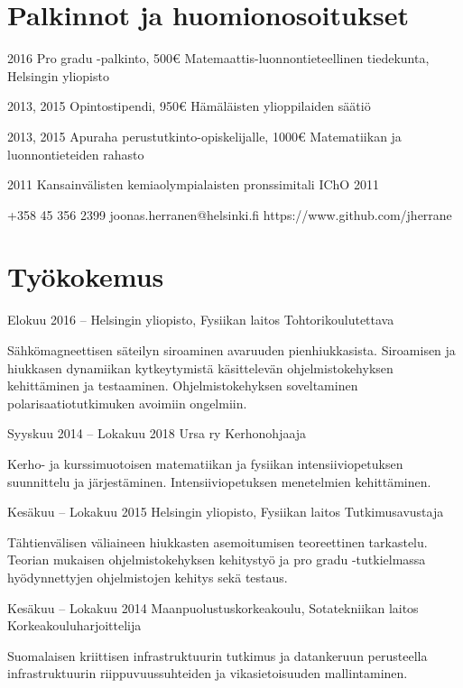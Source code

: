 \documentclass{tccv}
\begin{document}
\section{Palkinnot ja huomionosoitukset}
\begin{yearlist}
	\item{2016}
	{Pro gradu -palkinto, 500€}
	{Matemaattis-luonnontieteellinen tiedekunta, Helsingin yliopisto}
	\item{2013, 2015}
	{Opintostipendi, 950€}
	{Hämäläisten ylioppilaiden säätiö}	
	\item{2013, 2015}
	{Apuraha perustutkinto-opiskelijalle, 1000€}
	{Matematiikan ja luonnontieteiden rahasto}	
	\item{2011}
	{Kansainvälisten kemiaolympialaisten pronssimitali}
	{IChO 2011}	
\end{yearlist}

{+358 45 356 2399}
{joonas.herranen@helsinki.fi}
{https://www.github.com/jherrane}

\section{Työkokemus}
\begin{eventlist}	
	\item{Elokuu 2016 -- }
	{Helsingin yliopisto, Fysiikan laitos}
	{Tohtorikoulutettava}
	
	Sähkömagneettisen säteilyn siroaminen avaruuden pienhiukkasista. Siroamisen ja hiukkasen dynamiikan kytkeytymistä käsittelevän ohjelmistokehyksen kehittäminen ja testaaminen. Ohjelmistokehyksen soveltaminen polarisaatiotutkimuken avoimiin ongelmiin.
	
	\item{Syyskuu 2014 -- Lokakuu 2018}
	{Ursa ry}
	{Kerhonohjaaja}
	
	Kerho- ja kurssimuotoisen matematiikan ja fysiikan intensiiviopetuksen suunnittelu ja järjestäminen. Intensiiviopetuksen menetelmien kehittäminen. 
	
	\item{Kesäkuu -- Lokakuu 2015}
	{Helsingin yliopisto, Fysiikan laitos}
	{Tutkimusavustaja}
	
	Tähtienvälisen väliaineen hiukkasten asemoitumisen teoreettinen tarkastelu. Teorian mukaisen ohjelmistokehyksen kehitystyö ja pro gradu -tutkielmassa hyödynnettyjen ohjelmistojen kehitys sekä testaus.
	
	\item{Kesäkuu -- Lokakuu 2014}
	{Maanpuolustuskorkeakoulu, Sotatekniikan laitos}
	{Korkeakouluharjoittelija}
	
	Suomalaisen kriittisen infrastruktuurin tutkimus ja da\-tan\-ke\-ruun perusteella infrastruktuurin riippuvuussuhteiden ja vikasietoisuuden mallintaminen.
	
\end{eventlist}
\pagebreak
\end{document}
